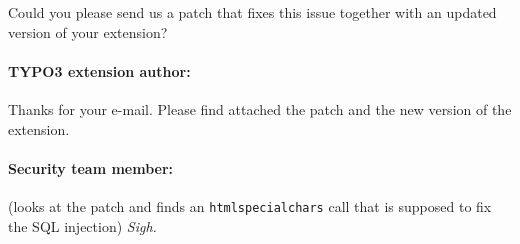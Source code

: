 Could you please send us a patch that fixes this issue together with an updated version of your extension?

\paragraph*{TYPO3 extension author:} Thanks for your e-mail. Please find attached the patch and the new version of the extension.

\paragraph*{Security team member:} (looks at the patch and finds an \texttt{htmlspecialchars} call that is supposed to fix the SQL injection) \emph{Sigh.}
